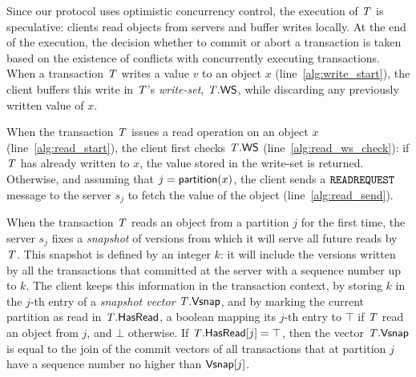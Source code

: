 Since our protocol uses optimistic concurrency control, the execution of $\mathit{T}$ is speculative: clients read objects from servers and buffer writes locally. At the end of the execution, the decision whether to commit or abort a transaction is taken based on the existence of conflicts with concurrently executing transactions. When a transaction $\mathit{T}$ writes a value $v$ to an object $x$ (line~\ref{alg:write_start}), the client buffers this write in $\mathit{T}$'s \emph{write-set}, $\mathit{T}.\mathsf{WS}$, while discarding any previously written value of $x$.

When the transaction $\mathit{T}$ issues a read operation on an object $x$ (line~\ref{alg:read_start}), the client first checks $\mathit{T}.\mathsf{WS}$ (line~\ref{alg:read_ws_check}): if $\mathit{T}$ has already written to $x$, the value stored in the write-set is returned. Otherwise, and assuming that $j = \mathsf{partition}(x)$, the client sends a ${\tt READREQUEST}$ message to the server $s_j$ to fetch the value of the object (line~\ref{alg:read_send}).

When the transaction $\mathit{T}$ reads an object from a partition $j$ for the first time, the server $s_j$ fixes a \emph{snapshot} of versions from which it will serve all future reads by $\mathit{T}$. This snapshot is defined by an integer $k$: it will include the versions written by all the transactions that committed at the server with a sequence number up to $k$. The client keeps this information in the transaction context, by storing $k$ in the $j$-th entry of a \emph{snapshot vector} $\mathit{T}.\mathsf{Vsnap}$, and by marking the current partition as read in $\mathit{T}.\mathsf{HasRead}$, a boolean mapping its $j$-th entry to $\top$ if $\mathit{T}$ read an object from $j$, and $\bot$ otherwise. If $\mathit{T}.\mathsf{HasRead}[j]=\top$, then the vector $\mathit{T}.\mathsf{Vsnap}$ is equal to the join of the commit vectors of all transactions that at partition $j$ have a sequence number no higher than $\mathsf{Vsnap}[j]$.

